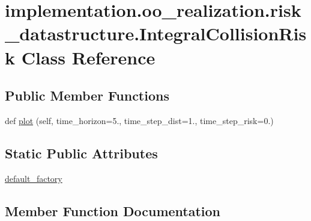 \hypertarget{classimplementation_1_1oo__realization_1_1risk__datastructure_1_1_integral_collision_risk}{}\section{implementation.\+oo\+\_\+realization.\+risk\+\_\+datastructure.\+Integral\+Collision\+Risk Class Reference}
\label{classimplementation_1_1oo__realization_1_1risk__datastructure_1_1_integral_collision_risk}
\subsection*{Public Member Functions}
\begin{DoxyCompactItemize}
\item 
def \hyperlink{classimplementation_1_1oo__realization_1_1risk__datastructure_1_1_integral_collision_risk_af32390c6e80a4d2bdd0a184299d7c65e}{plot} (self, time\+\_\+horizon=5., time\+\_\+step\+\_\+dist=1., time\+\_\+step\+\_\+risk=0.)
\end{DoxyCompactItemize}
\subsection*{Static Public Attributes}
\begin{DoxyCompactItemize}
\item 
\hyperlink{classimplementation_1_1oo__realization_1_1risk__datastructure_1_1_integral_collision_risk_a6617cfe3db631d60b3262a602bd401c6}{default\+\_\+factory}
\end{DoxyCompactItemize}


\subsection{Member Function Documentation}
\mbox{\label{classimplementation_1_1oo__realization_1_1risk__datastructure_1_1_integral_collision_risk_af32390c6e80a4d2bdd0a184299d7c65e}} 

